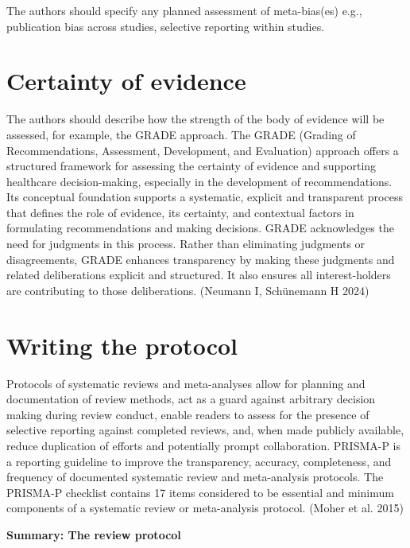 \documentclass[
  11pt,
  a4paper,
  DIV=11,
  numbers=noendperiod]{scrreprt}
\begin{document}
The authors should specify any planned assessment of meta-bias(es) e.g.,
publication bias across studies, selective reporting within studies.

\section{Certainty of evidence}\label{certainty-of-evidence}

The authors should describe how the strength of the body of evidence
will be assessed, for example, the GRADE approach. The GRADE (Grading of
Recommendations, Assessment, Development, and Evaluation) approach
offers a structured framework for assessing the certainty of evidence
and supporting healthcare decision-making, especially in the development
of recommendations. Its conceptual foundation supports a systematic,
explicit and transparent process that defines the role of evidence, its
certainty, and contextual factors in formulating recommendations and
making decisions. GRADE acknowledges the need for judgments in this
process. Rather than eliminating judgments or disagreements, GRADE
enhances transparency by making these judgments and related
deliberations explicit and structured. It also ensures all
interest-holders are contributing to those deliberations. (Neumann I,
Schünemann H 2024)

\section{Writing the protocol}\label{writing-the-protocol}

Protocols of systematic reviews and meta-analyses allow for planning and
documentation of review methods, act as a guard against arbitrary
decision making during review conduct, enable readers to assess for the
presence of selective reporting against completed reviews, and, when
made publicly available, reduce duplication of efforts and potentially
prompt collaboration. PRISMA-P is a reporting guideline to improve the
transparency, accuracy, completeness, and frequency of documented
systematic review and meta-analysis protocols. The PRISMA-P checklist
contains 17 items considered to be essential and minimum components of a
systematic review or meta-analysis protocol. (Moher et al. 2015)

\textbf{Summary: The review protocol}
\end{document}
